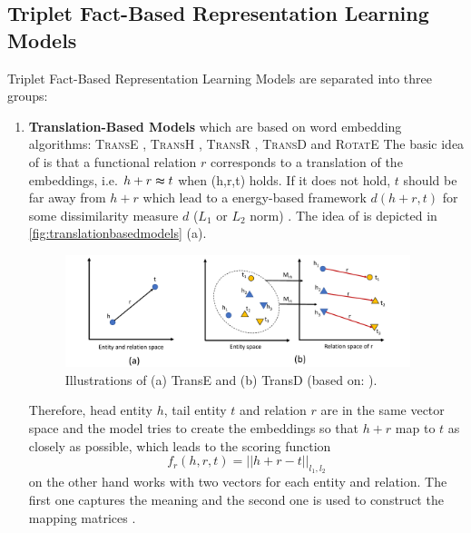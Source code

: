 \subsection{Triplet Fact-Based Representation Learning Models} 
\label{subsec:triplet_fact_based_representation_learning_models}


Triplet Fact-Based Representation Learning Models are separated into three groups:
\begin{enumerate}
    \item 
    \textbf{Translation-Based Models}  which are based on word embedding algorithms: 
    \textsc{TransE} \cite{TransE}, \textsc{TransH} \cite{TransH}, \textsc{TransR} \cite{TransR}, \textsc{TransD} \cite{TransD}
    and 
    \textsc{RotatE} \cite{RotatE}
    The basic idea of \transe is that a functional relation $r$ corresponds to a translation of the embeddings, i.e. $h + r \thickapprox t$ when (h,r,t) holds.
    If it does not hold, $t$ should be far away from $h + r$ which lead to a energy-based framework $d(h+r, t)$ for some dissimilarity measure $d$ ($L_1$ or $L_2$ norm) \cite{TransE}.
    The idea of \transe is depicted in \autoref{fig:translationbasedmodels} (a).
    \begin{figure}[t]
      \centering
        \includegraphics[width=0.95\textwidth]{figures/Transe+TransD.pdf}
      \caption{Illustrations of (a) TransE and (b) TransD (based on: \cite{electronics9050750}).}
      \label{fig:translationbasedmodels}
    \end{figure}
    Therefore, head entity $h$, tail entity $t$ and relation $r$ are in the same vector space and the model tries to create the embeddings so that $h+r$ map to $t$ as closely as possible, which leads to the scoring function
    \begin{equation}
        f_r(h,r,t) = || h + r - t ||_{l_1, l_2}
        \label{eq:transescoringfunction}
    \end{equation}
    \transd on the other hand works with two vectors for each entity and relation.
    The first one captures the meaning and the second one is used to construct the mapping matrices \cite{TransD}.


\end{enumerate}
